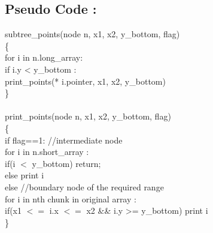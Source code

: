 \documentclass{article}
\begin{document}
\subsection{Pseudo Code : }

subtree\_points(node n, x1, x2, y\_bottom, flag)\\
\{\\
    \hspace{1cm}for i in n.long\_array:\\
    \hspace{2cm}       if i.y < y\_bottom :\\
    \hspace{3cm}                        print\_points(* i.pointer, x1, x2, y\_bottom)\\            
\}\\
\\
print\_points(node n, x1, x2, y\_bottom, flag)\\
\{\\
    \hspace{1cm}  if flag==1:             //intermediate node \\
    \hspace{1.5cm}for i in n.short\_array :\\
    \hspace{2cm}    if(i $<$ y\_bottom) return;\\
    \hspace{2cm}    else print i\\
    \hspace{1cm}  else     //boundary node of the required range\\
    \hspace{1.5cm}    for i in nth chunk in original array :\\
    \hspace{2cm} if(x1 $<=$ i.x $<=$ x2 \&\& i.y >= y\_bottom) print i \\
\}\\
\end{document}
